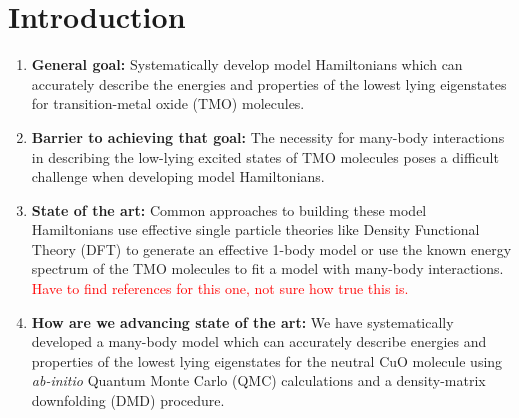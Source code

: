 \documentclass{article}
\begin{document}
\section{Introduction}
\begin{enumerate}
\item \textbf{General goal: }
Systematically develop model Hamiltonians which can accurately describe the energies and properties of the lowest lying eigenstates for transition-metal oxide (TMO) molecules.

\item \textbf{Barrier to achieving that goal: } The necessity for many-body interactions in describing the low-lying excited states of TMO molecules poses a difficult challenge when developing model Hamiltonians.

\item \textbf{State of the art: } Common approaches to building these model Hamiltonians use effective single particle theories like Density Functional Theory (DFT) to generate an effective 1-body model or use the known energy spectrum of the TMO molecules to fit a model with many-body interactions. 
\textcolor{red}{Have to find references for this one, not sure how true this is.}

\item\textbf{How are we advancing state of the art: } We have systematically developed a many-body model which can accurately describe energies and properties of the lowest lying eigenstates for the neutral CuO molecule using \textit{ab-initio} Quantum Monte Carlo (QMC) calculations and a density-matrix downfolding (DMD) procedure. 
\end{enumerate}
\end{document}
